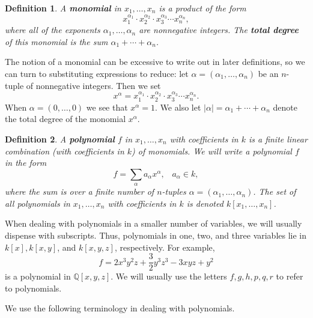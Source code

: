 \documentclass[12pt,reqno]{amsart}
\theoremstyle{plain}
\newtheorem{defi}{Definition}
\newcommand{\qq}{\mathbb Q}
\newcommand{\gap}{\; \; \;}
\begin{document}
\begin{defi} A \textup{\textbf{monomial}} in $x_1, \ldots, x_n$ is a product of the form \[ x_1^{\alpha_1} \cdot x_2^{\alpha_2} \cdot x_3^{\alpha_3} \cdots x_n^{\alpha_n},  \] where all of the exponents $\alpha_1, \ldots, \alpha_n$ are nonnegative integers. The \textup{\textbf{total degree}} of this monomial is the sum $\alpha_1 + \cdots + \alpha_n$. 
\end{defi}

The notion of a monomial can be excessive to write out in later definitions, so we can turn to substituting expressions to reduce: let $\alpha = (\alpha_1, \ldots, \alpha_n )$ be an $n$-tuple of nonnegative integers. Then we set $$x^{\alpha} = x_1^{\alpha_1} \cdot x_2^{\alpha_2} \cdot x_3^{\alpha_3} \cdots x_n^{\alpha_n}.$$
When $\alpha = (0, \ldots, 0)$ we see that $x^{\alpha} = 1$. We also let $|\alpha| = \alpha_1 + \cdots + \alpha_n$ denote the total degree of the monomial $x^{\alpha}$.

\begin{defi} A \textup{\textbf{polynomial}} $f$ in $x_1, \ldots, x_n$ with coefficients in $k$ is a finite linear combination (with coefficients in $k$) of monomials. We will write a polynomial $f$ in the form $$f = \sum_{\alpha} a_{\alpha} x^{\alpha}, \gap a_{\alpha} \in k, $$ where the sum is over a finite number of $n$-tuples $\alpha = (\alpha_1, \ldots, \alpha_n )$. The set of all polynomials in $x_1, \ldots , x_n$ with coefficients in $k$ is denoted $k \left[x_1, \ldots , x_n\right]$.
\end{defi}

When dealing with polynomials in a smaller number of variables, we will usually dispense with subscripts. Thus, polynomials in one, two, and three variables lie in $k[x], k[x,y]$, and $k[x,y,z]$, respectively. For example, $$f = 2x^3 y^2 z + \frac{3}{2} y^3 z^3 - 3xyz + y^2$$ is a polynomial in $\qq [x,y,z]$. We will usually use the letters $f, g, h, p, q, r$ to refer to polynomials. 

We use the following terminology in dealing with polynomials.
\end{document}

